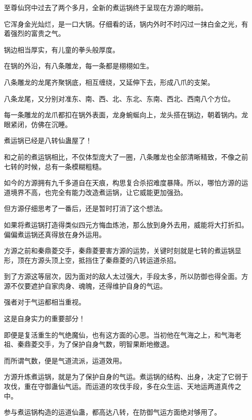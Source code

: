 
\begin{this_body}

至尊仙窍中过去了两个多月，全新的煮运锅终于呈现在方源的眼前。

它浑身金光灿烂，是一口大锅。仔细看的话，锅内外时不时闪过一抹白金之光，有着强烈的富贵之气。

锅边相当厚实，有儿童的拳头般厚度。

在锅的外沿，有八条雕龙，每一条都是栩栩如生。

八条雕龙的龙尾齐聚锅底，相互缠绕，又延伸下去，形成八爪的支架。

八条龙尾，又分别对准东、南、西、北、东北、东南、西北、西南八个方位。

每一条雕龙的龙爪都扣在锅外表面，龙身蜿蜒向上，龙头搭在锅边，朝着锅内。龙眼紧闭，仿佛在沉睡。

煮运锅已经是八转仙蛊屋了！

和之前的煮运锅相比，不仅体型庞大了一圈，八条雕龙也全部清晰精致，不像之前七转的时候，总有一条模糊粗糙。

如今的方源拥有九千多道自在天痕，构思复合杀招难度暴降。所以，哪怕方源的运道境界不高，也完全有能力改造煮运锅，让它威能更加强劲。

但方源仔细思考了一番后，还是暂时打消了这个想法。

如果将煮运锅打造得类似四元方悔血炼池，那么放到身外去用，威能将大打折扣。偏偏煮运锅还真得放在身外运用。

方源之前和秦鼎菱交手，秦鼎菱要害方源的运势，关键时刻就是七转的煮运锅显形，顶在方源头顶上空，抵挡住了秦鼎菱的八转运道杀招。

到了方源这等层次，因为面对的敌人太过强大，手段太多，所以防御也得全面。方源不仅要遮护自家肉身、魂魄，还得维护自身的气运。

强者对于气运都相当重视。

这是自身实力的重要部分！

即便是复活重生的气绝魔仙，也有这方面的心思。当初他在气海之上，和气海老祖、秦鼎菱交手，为了保护自身气数，明智果断地撤退。

而所谓气数，便是气道流派，运道效用。

方源升炼煮运锅，就是为了保护自身的气运。煮运锅的结构、出身，决定了它弱于攻伐，重在守御蛊仙气运。而运道的攻伐手段，多在众生运、天地运两道真传之中。

参与煮运锅构造的运道仙蛊，都高达八转，在防御气运方面绝对够用了。


\end{this_body}
